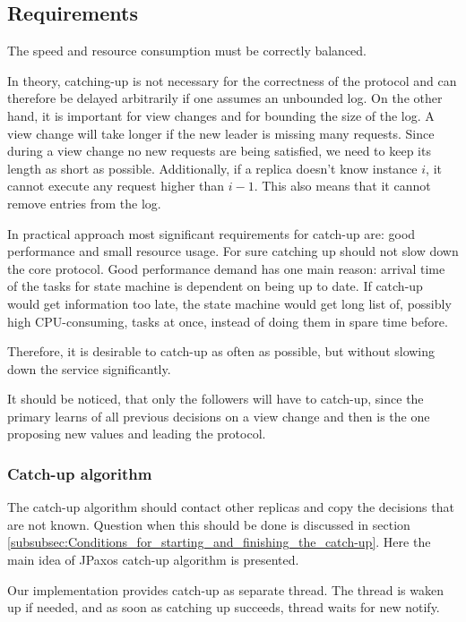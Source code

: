 \subsection{Requirements}
\label{subsec:Catch_up_requirements}
The speed and resource consumption must be correctly balanced.

In theory, catching-up is not necessary for the correctness of the protocol and can therefore be delayed arbitrarily if one assumes an unbounded log. On the other hand, it is important for view changes and for bounding the size of the log. A view change will take longer if the new leader is missing many requests. Since during a view change no new requests are being satisfied, we need to keep its length as short as possible. Additionally, if a replica doesn't know instance $i$, it cannot execute any request higher than $i-1$. This also means that it cannot remove entries from the log.

In practical approach most significant requirements for catch-up are: good performance and small resource usage. For sure catching up should not slow down the core protocol.
Good performance demand has one main reason: arrival time of the tasks for state machine is dependent on being up to date. If catch-up would get information too late, the state machine would get long list of, possibly high CPU-consuming, tasks at once, instead of doing them in spare time before.

Therefore, it is desirable to catch-up as often as possible, but without slowing down the service significantly.

It should be noticed, that only the followers will have to catch-up, since the primary learns of all previous decisions on a view change and then is the one proposing new values and leading the protocol.

\subsubsection{Catch-up algorithm}
\label{subsubsec:Catch_up_algorithm}
The catch-up algorithm should contact other replicas and copy the decisions that are not known. Question when this should be done is discussed in section \ref{subsubsec:Conditions_for_starting_and_finishing_the_catch-up}. Here the main idea of JPaxos catch-up algorithm is presented.

Our implementation provides catch-up as separate thread. The thread is waken up if needed, and as soon as catching up succeeds, thread waits for new notify.

